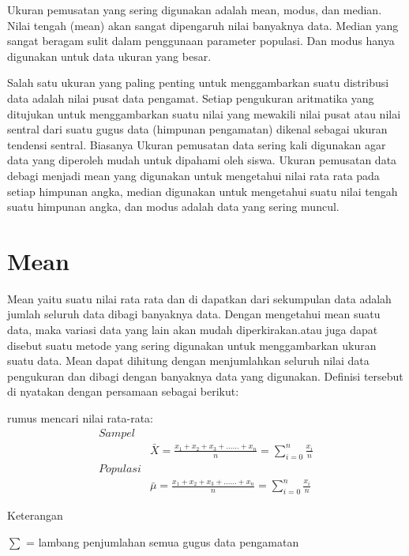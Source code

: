 \documentclass[11pt,fleqn]{book} %
\begin{document}
{Ukuran pemusatan yang sering digunakan adalah mean, modus, dan median. Nilai tengah (mean) akan sangat dipengaruh nilai banyaknya data. Median yang sangat beragam sulit dalam penggunaan parameter populasi. Dan modus hanya digunakan untuk data ukuran yang besar.

Salah satu ukuran yang paling penting untuk menggambarkan suatu distribusi data adalah nilai pusat data pengamat. Setiap pengukuran aritmatika yang ditujukan untuk menggambarkan suatu nilai yang mewakili nilai pusat atau nilai sentral dari suatu gugus data (himpunan pengamatan) dikenal sebagai ukuran tendensi sentral. Biasanya Ukuran pemusatan data sering kali digunakan agar data yang diperoleh mudah untuk dipahami oleh siswa. Ukuran pemusatan data debagi menjadi mean yang digunakan untuk mengetahui nilai rata rata pada setiap himpunan angka, median digunakan untuk mengetahui suatu nilai tengah suatu himpunan angka, dan modus adalah data yang sering muncul.



\section{Mean}

Mean yaitu suatu nilai rata rata dan di dapatkan dari sekumpulan data adalah jumlah seluruh data dibagi banyaknya data. Dengan mengetahui mean suatu data, maka variasi data yang lain akan mudah diperkirakan.atau juga dapat disebut suatu metode yang sering digunakan untuk menggambarkan ukuran suatu data. Mean dapat dihitung dengan menjumlahkan seluruh nilai data pengukuran dan dibagi dengan banyaknya data yang digunakan. Definisi tersebut di nyatakan dengan persamaan sebagai berikut:

\begin{theorem}[Mean]
rumus mencari nilai rata-rata:
\begin{align}
Sampel\\
& \bar{X}=\frac{x_{1}+x_{2}+x_{3}+......+x_{n}}{n}=\sum_{i=0}^{n}\frac{x_{i}}{n}\\
Populasi\\
& \bar{\mu}=\frac{x_{1}+x_{2}+x_{3}+......+x_{n}}{n}=\sum_{i=0}^{n}\frac{x_{i}}{n}
\end{align}
\end{theorem}

Keterangan

$\sum$ = lambang penjumlahan semua gugus data pengamatan 

}
\end{document}

